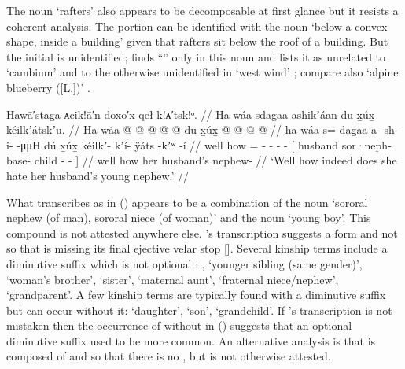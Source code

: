The noun  ‘rafters’ also appears to be decomposable at first glance but it resists a coherent analysis.
The  portion can be identified with the noun  ‘below a convex shape, inside a building’ given that rafters sit below the roof of a building.
But the initial  is unidentified; \citeauthor{leer:1973} finds “” only in this noun \parencite[f06/49]{leer:1973} and lists it as unrelated to  ‘cambium’ \parencite[f06/48]{leer:1973} and to the otherwise unidentified  in  ‘west wind’ \parencite[f06/50]{leer:1973}; compare also  ‘alpine blueberry ([L.])’ \parencite[09/326]{leer:1973}. 

\ex\label{ex:91-10-hate-husbands-nephew}%
%
\begingl
	\glpreamble	Hawā′staga ᴀcik!ā′n doxo′x qeł k!ᴀ′tsk!ᵒ. //
	\glpreamble	Ha wáa sdagaa ashikʼáan du x̱úx̱ kéilkʼátskʼu. //
	\gla	Ha wáa  @ {}
		 @ {} @ {} @ {} @ {}
		{} du x̱úx̱  @ {} @ {} @ {} @ {} {} //
	\glb	ha wáa s= dagaa
		a- sh- i-  -μμH
		{} dú x̱úx̱ kéilkʼ- kʼí- ÿáts -kʼʷ -í {} //
	\glc	well how = 
		- - -  -
		{}[  husband sor·neph- base- child - - {}] //
	\gld	well how  {}
		 {} {} {} {}
		{} her husband’s nephew-  {} {} {} {} //
	\glft	‘Well how indeed does she hate her husband’s young nephew.’
		//
\endgl
\xe

What \citeauthor{swanton:1909} transcribes as  in (\lastx) appears to be a combination of the noun  ‘sororal nephew (of man), sororal niece (of woman)’ and the noun  ‘young boy’.
This compound is not attested anywhere else.
\citeauthor{swanton:1909}’s transcription suggests a form  and not  so that  is missing its final ejective velar stop [].
Several kinship terms include a diminutive suffix  which is not optional \parencite[cf.][]{krauss:1977b}: ,  ‘younger sibling (same gender)’,  ‘woman’s brother’,  ‘sister’,  ‘maternal aunt’,  ‘fraternal niece/nephew’,  ‘grandparent’.
A few kinship terms are typically found with a diminutive suffix but can occur without it:  ‘daughter’,  ‘son’,  ‘grandchild’.
If \citeauthor{swanton:1909}’s transcription is not mistaken then the occurrence of  without  in (\lastx) suggests that an optional diminutive suffix used to be more common.
An alternative analysis is that  is composed of  and  so that there is no , but  is not otherwise attested.

